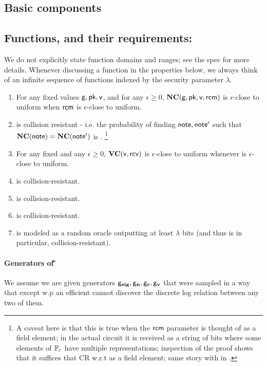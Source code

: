 \documentclass[11pt]{article}
\numberwithin{equation}{section} %
\numberwithin{figure}{section} %
\newcommand{\eps}{\ensuremath{\epsilon}\xspace}
\begin{document}
 \subsection{Basic components}
\subsection*{Functions, and their requirements:}
We do not explicitly state function domains and ranges; see the spec for more details.
Whenever discussing a function in the properties below, we always think of an infinite sequence of functions indexed by the security parameter $\lambda$.
\begin{enumerate}
 \item For any fixed values $\mathsf{g},\mathsf{pk},\mathsf{v}$, and for any $\eps\geq 0$, $\mathbf{NC}(\mathsf{g},\mathsf{pk},\mathsf{v},\mathsf{rcm})$ is $\eps$-close to uniform when $\mathsf{rcm}$ is $\eps$-close to uniform.
 \item \notecom is collision resistant - i.e. the probability of finding $\mathsf{note},\mathsf{note}'$ such that $\mathbf{NC}(\mathsf{note})=\mathbf{NC}(\mathsf{note}')$ is \negl. \footnote{A caveat here is that this is true when the $\mathsf{rcm}$ parameter is thought of as a field element; in the actual circuit it is received as a string of bits where some elements of ${\mathbb F}_r$ have multiple representations; inspection of the proof shows that it suffices that CR w.r.t \rcm as a field element; same story with \rcv in \valcom.}
\item For any fixed \val and any $\eps\geq 0$, $\mathbf{VC}(\mathsf{v},\mathsf{rcv})$ is $\eps$-close to uniform whenever \rcv is $\eps$-close to uniform. 
\item \valcom is collision-resistant.
\item \sighash is collision-resistant.
\item \IVK is collision-resistant.
\item \NF is modeled as a random oracle outputting at least $\lambda$ bits (and thus is in particular, collision-resistant).
\end{enumerate}
\paragraph{Generators of \G}
We assume we are given generators $\mathsf{g}_{\mathbf{sig}},\mathsf{g}_{\mathbf{n}},\mathsf{g}_\mathbf{r},\mathsf{g}_{\mathbf{v}}$ that were sampled in a way that except w.p \negl
an efficient \adv cannot discover the discrete log relation between any two of them.
\end{document}
